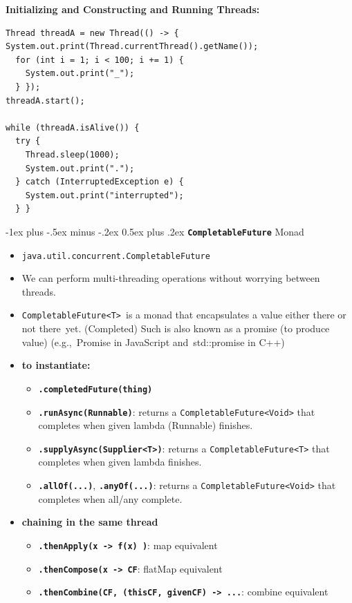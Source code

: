 \documentclass[12pt, landscape]{article}
\makeatletter
\newcommand{\code}[1]{\colorbox{gray!25!}{\lstinline|#1|}}
\renewcommand{\section}{\@startsection{section}{1}{0mm}%
                                {-1ex plus -.5ex minus -.2ex}%
                                {0.5ex plus .2ex}%
                                {\normalfont\large\bfseries}}
\makeatother
\begin{document}
\begin{multicols*}{3}
\textbf{Initializing and Constructing and Running Threads:}
\begin{lstlisting}
Thread threadA = new Thread(() -> {
System.out.print(Thread.currentThread().getName());
  for (int i = 1; i < 100; i += 1) {
    System.out.print("_");
  } });
threadA.start();

while (threadA.isAlive()) {
  try {
    Thread.sleep(1000);
    System.out.print(".");
  } catch (InterruptedException e) {
    System.out.print("interrupted");
  } }
\end{lstlisting}



\section{\textbf{\code{CompletableFuture}} Monad}
\begin{itemize}
\item \code{java.util.concurrent.CompletableFuture}
\item We can perform multi-threading operations without worrying between threads. 
\item \code{CompletableFuture<T>} is a monad that encapsulates a value either there or not there yet. (Completed) Such is also known as a promise (to produce value) (e.g., Promise in JavaScript and std::promise in C++) 
\item \textbf{to instantiate:}
\begin{itemize}
\item \textbf{\code{.completedFuture(thing)}}
\item \textbf{\code{.runAsync(Runnable)}}: returns a \code{CompletableFuture<Void>} that completes when given lambda (Runnable) finishes.
\item \textbf{\code{.supplyAsync(Supplier<T>)}}: returns a \code{CompletableFuture<T>} that completes when given lambda finishes.
\item \textbf{\code{.allOf(...)}}, \textbf{\code{.anyOf(...)}}: returns a \code{CompletableFuture<Void>} that completes when all/any complete.
\end{itemize}
\item \textbf{chaining in the same thread}
\begin{itemize}
\item \textbf{\code{.thenApply(x -> f(x) )}}: map equivalent
\item \textbf{\code{.thenCompose(x -> CF}}: flatMap equivalent
\item \textbf{\code{.thenCombine(CF, (thisCF, givenCF) -> ...}}: combine equivalent

\end{itemize}
\end{itemize}
\end{multicols*}
\end{document}
